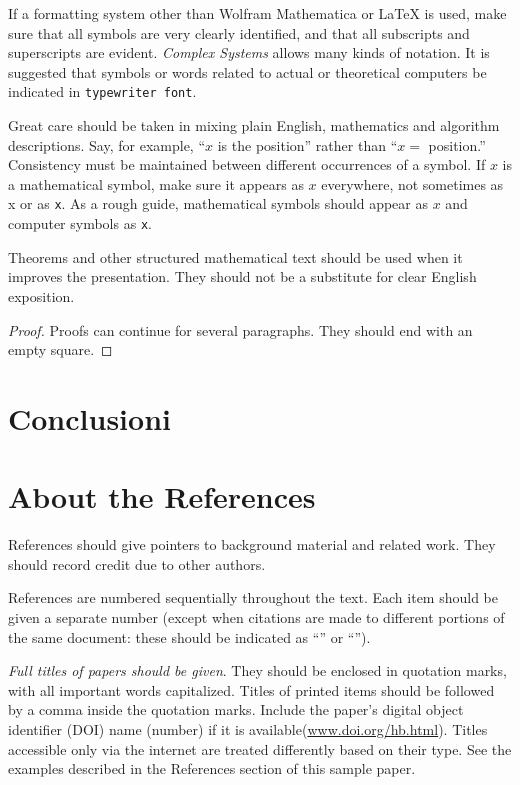\documentclass{article}
\begin{document}
If a formatting system other than Wolfram Mathematica or LaTeX is used, make sure that all symbols are very clearly identified, and that all subscripts and superscripts are evident. \textit{Complex Systems} allows many kinds of notation. It is suggested that symbols or words related to actual or theoretical computers be indicated in \texttt{typewriter font}. 

Great care should be taken in mixing plain English, mathematics and algorithm descriptions. Say, for example, {``}\(x\) is the position{''} rather than {``}\(x=\) position.{''} Consistency must be maintained between different occurrences of a symbol. If \(x\) is a mathematical symbol, make sure it appears as \(x\) everywhere, not sometimes as x or as \texttt{x}. As a rough guide, mathematical symbols should appear as \(x\) and computer symbols as \texttt{x}. 

\begin{theorem}
Theorems and other structured mathematical text should be used when it improves the presentation. They should not be a substitute for clear English exposition. 
\end{theorem}

\begin{proof}
Proofs can continue for several paragraphs. They should end with an empty square.
\end{proof}

\section{Conclusioni}

\section{About the References}

References should give pointers to background material and related work. They should record credit due to other authors. 

References are numbered sequentially throughout the text. 
Each item should be given a separate number (except when citations are made to different portions of the same document: these should be indicated as {``}\cite[pp. 3--56]{text-a}{''} or {``}\cite[Chapter 14]{text-b}{''}). 

\textit{Full titles of papers should be given}. They should be enclosed in quotation marks, with all important words capitalized. Titles of printed items should be followed by a comma inside the quotation marks. Include the paper{'}s digital object identifier (DOI) name (number) if it is available(\url{www.doi.org/hb.html}). Titles accessible only via the internet are treated differently based on their type. See the examples described in the References section of this sample paper.
\end{document}
